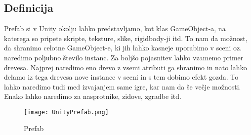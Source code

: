{\color{indiagreen}\subsection{Definicija}}
Prefab si v Unity okolju lahko predstavljamo, kot klas GameObject-a, na katerega so pripete skripte, teksture, slike, rigidbody-ji itd. To nam da možnost, da shranimo celotne GameObject-e, ki jih lahko kasneje uporabimo v sceni oz. naredimo poljubno število instanc. Za boljšo pojasnitev lahko vzamemo primer drevesa. Najprej naredimo eno drevo z vsemi atributi ga shranimo in nato lahko delamo iz tega drevesa nove instance v sceni in s tem dobimo efekt gozda. To lahko naredimo tudi med izvajanjem same igre, kar nam da še večje možnosti. Enako lahko naredimo za nasprotnike, zidove, zgradbe itd.
\begin{figure}[ht!]
	\centering
	\texttt{[image: UnityPrefab.png]}
	\caption{Prefab}
\end{figure}